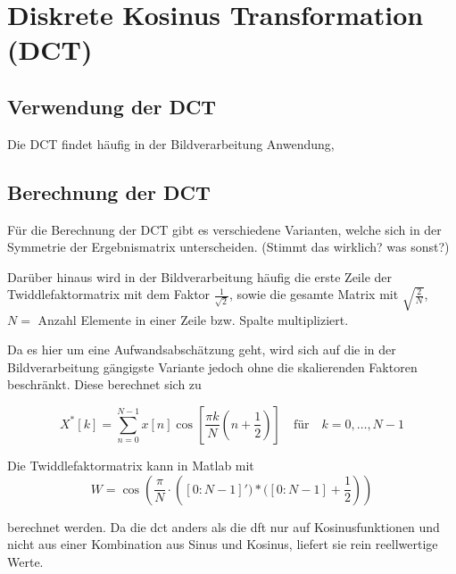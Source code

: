 \section{Diskrete Kosinus Transformation (DCT)}
\subsection{Verwendung der DCT}
Die DCT findet häufig in der Bildverarbeitung Anwendung, 

\subsection{Berechnung der DCT}
Für die Berechnung der DCT gibt es verschiedene Varianten, welche sich in der Symmetrie der Ergebnismatrix unterscheiden. (Stimmt das wirklich? was sonst?)

Darüber hinaus wird in der Bildverarbeitung häufig die erste Zeile der Twiddlefaktormatrix mit dem Faktor $\frac{1}{\sqrt2}$, sowie die gesamte Matrix mit 
$\sqrt{\frac{2}{N}}$, $N =$ Anzahl Elemente in einer Zeile bzw. Spalte multipliziert.

Da es hier um eine Aufwandsabschätzung geht, wird sich auf die in der Bildverarbeitung gängigste Variante jedoch ohne die skalierenden Faktoren beschränkt.
Diese berechnet sich zu

\begin{equation}
X^*[k] = \sum_{n=0}^{N-1} x[n] \cos\left[\frac{\pi k}{N} \left(n+\frac{1}{2}\right) \right] \quad \textrm{für} \quad  k=0,\dots,N-1
\end{equation}

Die Twiddlefaktormatrix kann in Matlab mit
 \begin{equation}\label{eq:matlab_dct_faktoren}
  W = \cos\left(\frac{\pi}{N}\cdot \left([0:N-1]')*([0:N-1]+\frac{1}{2}\right)\right)
 \end{equation}

berechnet werden. Da die \gls{dct} anders als die \gls{dft} nur auf Kosinusfunktionen und nicht aus einer Kombination aus Sinus und Kosinus, liefert sie rein
reellwertige Werte.